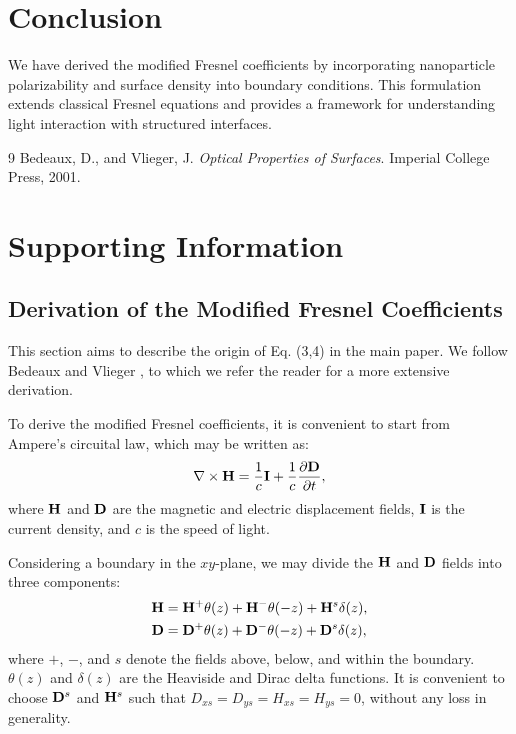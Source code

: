 \documentclass{article}
\begin{document}
	\section{Conclusion}
	We have derived the modified Fresnel coefficients by incorporating nanoparticle polarizability and surface density into boundary conditions. This formulation extends classical Fresnel equations and provides a framework for understanding light interaction with structured interfaces.
	
	
	\begin{thebibliography}{9}
		 Bedeaux, D., and Vlieger, J. \textit{Optical Properties of Surfaces}. Imperial College Press, 2001.
	\end{thebibliography}
	
	\section{Supporting Information}
	
	\subsection{Derivation of the Modified Fresnel Coefficients}
	This section aims to describe the origin of Eq. (3,4) in the main paper. We follow Bedeaux and Vlieger \cite{bedeaux2001optical}, to which we refer the reader for a more extensive derivation.
	
	To derive the modified Fresnel coefficients, it is convenient to start from Ampere's circuital law, which may be written as:  
	\begin{equation}
		\nabla \times \vb{H} = \frac{1}{c} \vb{I} + \frac{1}{c} \frac{\partial \vb{D}}{\partial t},
	\end{equation}
	where $\vb{H}$ and $\vb{D}$ are the magnetic and electric displacement fields, $\vb{I}$ is the current density, and $c$ is the speed of light. 
	
	Considering a boundary in the $xy$-plane, we may divide the $\vb{H}$ and $\vb{D}$ fields into three components:
	\begin{align}
		\vb{H} &= \vb{H}^{+} \theta(z) + \vb{H}^{-} \theta(-z) + \vb{H}^{s} \delta(z), \\
		\vb{D} &= \vb{D}^{+} \theta(z) + \vb{D}^{-} \theta(-z) + \vb{D}^{s} \delta(z),
	\end{align}
	where $+$, $-$, and $s$ denote the fields above, below, and within the boundary. $\theta(z)$ and $\delta(z)$ are the Heaviside and Dirac delta functions. It is convenient to choose $\vb{D}^{s}$ and $\vb{H}^{s}$ such that $D_{xs} = D_{ys} = H_{xs} = H_{ys} = 0$, without any loss in generality.
	
\end{document}
